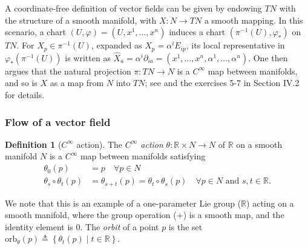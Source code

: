 \documentclass[psamsfonts]{amsart}
\theoremstyle{definition}
\newtheorem{defn}[thm]{Definition}
\theoremstyle{remark}
\newcommand*\R{\mathds{R}}
\numberwithin{equation}{section}
\begin{document}
A coordinate-free definition of vector fields can be given by endowing $TN$ with the structure of a smooth manifold, with $X:N\rightarrow TN$ a smooth mapping. In this scenario, a chart $(U, \varphi) = (U, x^1, \dots, x^n)$ induces a chart $(\pi^{-1}(U), \varphi_*)$ on $TN$. For $X_p\in \pi^{-1}(U)$, expanded as $X_p = \alpha^i E_{ip}$, its local representative in $\varphi_*(\pi^{-1}(U))$ is written as $\hat X_a = \alpha^i \partial_{ia} = (x^1, \dots, x^n, \alpha^1, \dots, \alpha^n)$. One then argues that the natural projection $\pi:TN\rightarrow N$ is a $C^{\infty}$ map between manifolds, and so is $X$ as a map from $N$ into $TN$; see \cite{nijmeijer_nonlinear_1990} and the exercises 5-7 in \cite{boothby_2002} Section IV.2 for details. 


\subsubsection{Flow of a vector field}

\begin{defn}[$C^{\infty}$ action]\label{defn:cinfaction}
The \textit{$C^{\infty}$ action} $\theta:\R \times N \rightarrow N$ of $\R$ on a smooth manifold $N$ is a $C^{\infty}$ map between manifolds satisfying
\begin{equation}
\begin{aligned}
\theta_0(p) &= p \quad \forall p\in N\\
\theta_s \circ \theta_t (p) &= \theta_{s+t}(p) = \theta_t\circ \theta_s (p) \quad \forall p\in N \text{ and } s, t \in \R. 
\end{aligned}%
\end{equation}
\end{defn}

We note that this is an example of a one-parameter Lie group ($\R$) acting on a smooth manifold, where the group operation ($+$) is a smooth map, and the identity element is $0$. The \textit{orbit} of a point $p$ is the set $\text{orb}_{\theta}(p) \triangleq \left\{\theta_t(p) \mid t\in \R \right\}$. 
\end{document}
